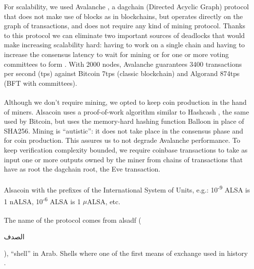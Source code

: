 \documentclass[a4paper,10pt]{article}
\begin{document}
For scalability, we used Avalanche \cite{10}, a dagchain (Directed Acyclic Graph) protocol that does not make use of blocks as in blockchains, but operates directly on the graph of transactions, and does not require any kind of mining protocol. Thanks to this protocol we can eliminate two important sources of deadlocks that would make increasing scalability hard: having to work on a single chain and having to increase the consensus latency to wait for mining or for one or more voting committees
to form \cite{4}. With 2000 nodes, Avalanche guarantees 3400 transactions per second (tps) against Bitcoin 7tps (classic blockchain) and Algorand 874tps (BFT with committees).\\\\

Although we don’t require mining, we opted to keep coin production in the hand of miners. Alsacoin uses a proof-of-work algorithm similar to Hashcash \cite{11}, the same used by Bitcoin, but uses the memory-hard hashing function Balloon \cite{12} in place of SHA256. Mining is “autistic”: it does not take place in the consensus phase and for coin production. This assures us to not degrade Avalanche performance. To keep verification complexity bounded, we require coinbase transactions to take as input one or more outputs owned by the miner from chains of transactions that have as root the dagchain root, the Eve transaction.\\\\

Alsacoin with the prefixes of the International System of Units, e.g.: 10\textsuperscript{-9} ALSA is 1 nALSA, 10\textsuperscript{-6} ALSA is 1 $\mu$ALSA, etc.\\\\

The name of the protocol comes from alsadf (\begin{Arabic}الصدف\end{Arabic}), “shell” in Arab. Shells where one of the first means of exchange used in history \cite{2}.

\medskip

\printbibliography
\end{document}
